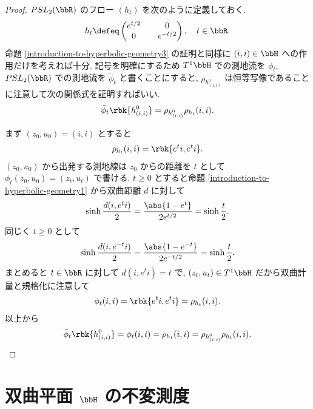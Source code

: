 \documentclass[openany, a4paper, oneside]{jsbook}
\begin{document}
\begin{proof}
$PSL_2(\bbR)$ のフロー $(h_t)$ を次のように定義しておく.
\begin{align}
 h_t
 \defeq
 \begin{pmatrix}
  e^{t/2} && 0 \\
  0       && e^{-t/2}
 \end{pmatrix}, \quad t \in \bbR.
\end{align}
命題 \ref{introduction-to-hyperbolic-geometry3} の証明と同様に $(i, i) \in \bbH$ への作用だけを考えれば十分.
記号を明確にするため $T^1 \bbH$ での測地流を $\phi_t$, $PSL_2 (\bbR)$ での測地流を $\tilde{\phi}_t$ と書くことにすると,
$\rho_{h_{(i, i)}^0}$ は恒等写像であることに注意して次の関係式を証明すればいい.
\begin{align}
 \tilde{\phi}_t \rbk{h_{(i, i)}^0}
 =
 \rho_{h_{(i, i)}^0} \rho_{h_t} (i, i).
\end{align}

まず $(z_0, u_0) = (i, i)$ とすると
\begin{align}
 \rho_{h_t} (i, i)
 =
 \rbk{e^t i, e^t i}.
\end{align}
$(z_0, u_0)$ から出発する測地線は $z_0$ からの距離を $t$ として $\phi_t (z_0, u_0) = (z_t, u_t)$ で書ける.
$t \geq 0$ とすると命題 \ref{introduction-to-hyperbolic-geometry1} から双曲距離 $d$ に対して
\begin{align}
 \sinh \frac{d(i, e^t i)}{2}
 =
 \frac{\abs{1 - e^t}}{2 e^{t/2}}
 =
 \sinh \frac{t}{2}.
\end{align}
同じく $t \geq 0$ として
\begin{align}
 \sinh \frac{d(i, e^{-t} i)}{2}
 =
 \frac{\abs{1 - e^{-t}}}{2 e^{-t/2}}
 =
 \sinh \frac{t}{2}.
\end{align}
まとめると $t \in \bbR$ に対して $d(i, e^t i) = t$ で, $(z_t, u_t) \in T^1 \bbH$ だから双曲計量と規格化に注意して
\begin{align}
 \phi_t (i, i)
 =
 \rbk{e^t i, e^t i}
 =
 \rho_{h_t} (i, i).
\end{align}
以上から
\begin{align}
 \tilde{\phi}_t \rbk{h_{(i, i)}^0}
 =
 \phi_t (i, i)
 =
 \rho_{h_t}(i, i)
 =
 \rho_{h_{(i, i)}^0} \rho_{h_t} (i, i).
\end{align}
\end{proof}
\section{双曲平面 $\bbH$ の不変測度\label{introduction-to-hyperbolic-geometry11}}
\end{document}
